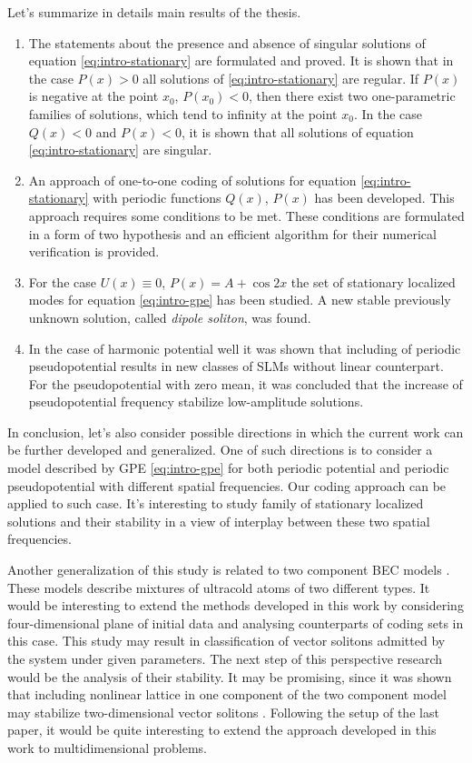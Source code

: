 Let's summarize in details main results of the thesis.
\begin{enumerate}
	\item The statements about the presence and absence of singular solutions of equation \eqref{eq:intro-stationary} are formulated and proved.
		It is shown that in the case $P(x) > 0$ all solutions of \eqref{eq:intro-stationary} are regular.
		If $P(x)$ is negative at the point $x_0$, $P(x_0) < 0$, then there exist two one-parametric families of solutions, which tend to infinity at the point $x_0$.
		In the case $Q(x) < 0$ and $P(x) < 0$, it is shown that all solutions of equation \eqref{eq:intro-stationary} are singular.
	\item An approach of one-to-one coding of solutions for equation \eqref{eq:intro-stationary} with periodic functions $Q(x)$, $P(x)$ has been developed.
		This approach requires some conditions to be met.
		These conditions are formulated in a form of two hypothesis and an efficient algorithm for their numerical verification is provided.
	\item For the case $U(x) \equiv 0$, $P(x) = A + \cos 2x$ the set of stationary localized modes for equation \eqref{eq:intro-gpe} has been studied.
		A new stable previously unknown solution, called {\it dipole soliton}, was found.
	\item In the case of harmonic potential well it was shown that including of periodic pseudopotential results in new classes of SLMs without linear counterpart.
		For the pseudopotential with zero mean, it was concluded that the increase of pseudopotential frequency stabilize low-amplitude solutions.
\end{enumerate}

In conclusion, let's also consider possible directions in which the current work can be further developed and generalized.
One of such directions is to consider a model described by GPE \eqref{eq:intro-gpe} for both periodic potential and periodic pseudopotential with different spatial frequencies.
Our coding approach can be applied to such case.
It's interesting to study family of stationary localized solutions and their stability in a view of interplay between these two spatial frequencies.

Another generalization of this study is related to two component BEC models \cite{TrippenbachGoralRzazewskiMalomedBand, OhbergSantos, SvidzinskyChui, NavarroCarreteroGonzalezKevrekidis, KevrekidisFrantzeskakis2016}.
These models describe mixtures of ultracold atoms of two different types.
It would be interesting to extend the methods developed in this work by considering four-dimensional plane of initial data and analysing counterparts of coding sets in this case. 
This study may result in classification of vector solitons admitted by the system under given parameters.
The next step of this perspective research would be the analysis of their stability.
It may be promising, since it was shown that including nonlinear lattice in one component of the two component model may stabilize two-dimensional vector solitons \cite{BorovkovaMalomedKartashov}.
Following the setup of the last paper, it would be quite interesting to extend the approach developed in this work to multidimensional problems.
